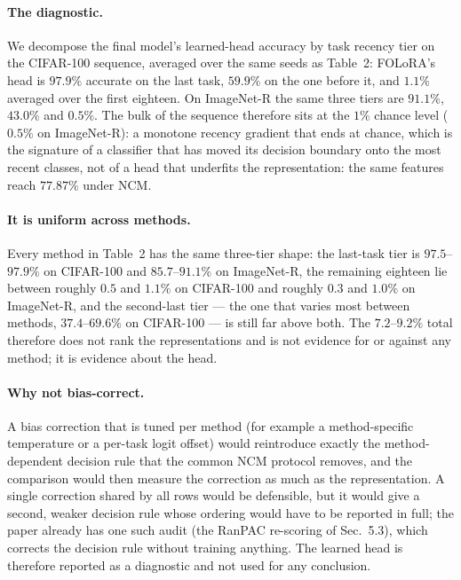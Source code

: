 \paragraph{The diagnostic.} We decompose the final model's learned-head accuracy by task
recency tier on the CIFAR-100 sequence, averaged over the same seeds as Table~2:
FOLoRA's head is $97.9\%$ accurate on the last task, $59.9\%$ on the one before it, and
$1.1\%$ averaged over the first eighteen. On ImageNet-R the same three tiers are
$91.1\%$, $43.0\%$ and $0.5\%$. The bulk of the sequence therefore sits at the $1\%$ chance
level ($0.5\%$ on ImageNet-R): a monotone recency gradient that ends at chance, which is the
signature of a classifier
that has moved its decision boundary onto the most recent classes, not of a head that
underfits the representation: the same features reach $77.87\%$ under NCM.

\paragraph{It is uniform across methods.} Every method in Table~2 has the same three-tier
shape: the last-task tier is $97.5$--$97.9\%$ on CIFAR-100 and $85.7$--$91.1\%$ on
ImageNet-R, the remaining eighteen lie between roughly $0.5$ and $1.1\%$ on CIFAR-100 and
roughly $0.3$ and $1.0\%$ on ImageNet-R, and the second-last tier --- the one that varies most between methods,
$37.4$--$69.6\%$ on CIFAR-100 --- is still far above both. The
$7.2$--$9.2\%$ total therefore does not rank the representations and is not evidence for or
against any method; it is evidence about the head.

\paragraph{Why not bias-correct.} A bias correction that is tuned per method (for example a
method-specific temperature or a per-task logit offset) would reintroduce exactly the
method-dependent decision rule that the common NCM protocol removes, and the comparison would
then measure the correction as much as the representation. A single correction shared by all
rows would be defensible, but it would give a second, weaker decision rule whose ordering
would have to be reported in full; the paper already has one such audit (the RanPAC
re-scoring of Sec.~5.3), which corrects the decision rule without training
anything. The learned head is therefore reported as a diagnostic and not used for any
conclusion.


